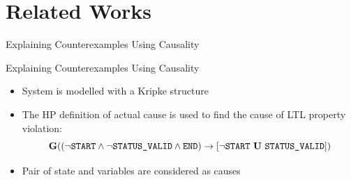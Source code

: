 \section{Related Works}

\begin{frame}{Explaining Counterexamples Using Causality}
    \begin{figure}
        \centering
    \end{figure}
\end{frame}

\begin{frame}{Explaining Counterexamples Using Causality}
    \begin{itemize}
        \item System is modelled with a Kripke structure
        \item The HP definition of actual cause is used to find the cause 
        of LTL property violation:
              \begin{equation*}
                  \boldsymbol{\mr{G}}((\neg \texttt{START} \wedge \neg \texttt{STATUS\_VALID} \wedge \texttt{END})
                  \ra [\neg \texttt{START}\ \boldsymbol{\mr{U}}\ \texttt{STATUS\_VALID}])
              \end{equation*}
        \item Pair of state and variables are considered as causes
    \end{itemize}
    \begin{figure}
        \centering
    \end{figure}
\end{frame}

